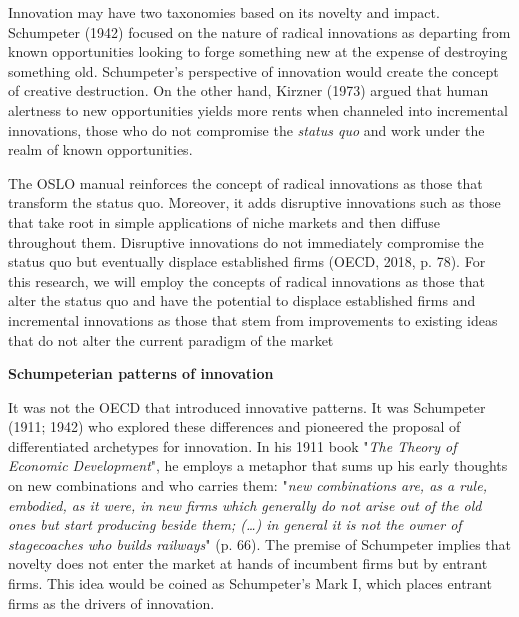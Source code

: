 \documentclass[12pt,a4paper]{article}
\begin{document}
Innovation may have two taxonomies based on its novelty and impact. Schumpeter (1942) focused on the nature of radical innovations as departing from known opportunities looking to forge something new at the expense of destroying something old. Schumpeter's perspective of innovation would create the concept of creative destruction. On the other hand, Kirzner (1973) argued that human alertness to new opportunities yields more rents when channeled into incremental innovations, those who do not compromise the \textit{status quo} and work under the realm of known opportunities. 

The OSLO manual reinforces the concept of radical innovations as those that transform the status quo. Moreover, it adds disruptive innovations such as those that take root in simple applications of niche markets and then diffuse throughout them. Disruptive innovations do not immediately compromise the status quo but eventually displace established firms (OECD, 2018, p. 78). For this research, we will employ the concepts of radical innovations as those that alter the status quo and have the potential to displace established firms and incremental innovations as those that stem from improvements to existing ideas that do not alter the current paradigm of the market  

\pagebreak

\noindent \textbf{Schumpeterian patterns of innovation }

It was not the OECD that introduced innovative patterns. It was Schumpeter (1911; 1942) who explored these differences and pioneered the proposal of differentiated archetypes for innovation. In his 1911 book "\textit{The Theory of Economic Development}", he employs a metaphor that sums up his early thoughts on new combinations and who carries them: "\textit{new combinations are, as a rule, embodied, as it were, in new firms which generally do not arise out of the old ones but start producing beside them; (…) in general it is not the owner of stagecoaches who builds railways}" (p. 66). The premise of Schumpeter implies that novelty does not enter the market at hands of incumbent firms but by entrant firms. This idea would be coined as Schumpeter's Mark I, which places entrant firms as the drivers of innovation.
\end{document}
